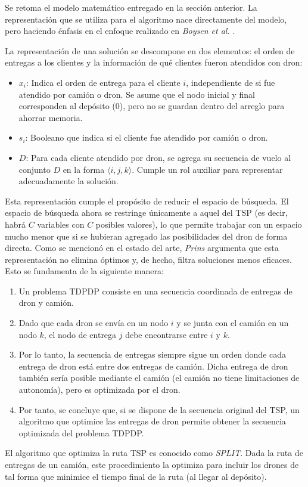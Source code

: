 Se retoma el modelo matemático entregado en la sección anterior. La representación que se utiliza para el algoritmo nace directamente del modelo, pero haciendo énfasis en el enfoque realizado en \textit{Boysen et al.} \cite{boysen2018drone}. 

La representación de una solución se descompone en dos elementos: el orden de entregas a los clientes y la información de qué clientes fueron atendidos con dron:

\begin{itemize}
\item $x_i$: Indica el orden de entrega para el cliente $i$, independiente de si fue atendido por camión o dron. Se asume que el nodo inicial y final corresponden al depósito ($0$), pero no se guardan dentro del arreglo para ahorrar memoria.
\item $s_i$: Booleano que indica si el cliente fue atendido por camión o dron.
\item $D$: Para cada cliente atendido por dron, se agrega su secuencia de vuelo al conjunto $D$ en la forma $\langle i, j, k \rangle$. Cumple un rol auxiliar para representar adecuadamente la solución.
\end{itemize}

Esta representación cumple el propósito de reducir el espacio de búsqueda. El espacio de búsqueda ahora se restringe únicamente a aquel del TSP (es decir, habrá $C$ variables con $C$ posibles valores), lo que permite trabajar con un espacio mucho menor que si se hubieran agregado las posibilidades del dron de forma directa. 
Como se mencionó en el estado del arte, \textit{Prins} \cite{prins2004simple} argumenta que esta representación no elimina óptimos y, de hecho, filtra soluciones menos eficaces. Esto se fundamenta de la siguiente manera:

\begin{enumerate}
\item Un problema TDPDP consiste en una secuencia coordinada de entregas de dron y camión. 
\item Dado que cada dron se envía en un nodo $i$ y se junta con el camión en un nodo $k$, el nodo de entrega $j$ debe encontrarse entre $i$ y $k$.
\item Por lo tanto, la secuencia de entregas siempre sigue un orden donde cada entrega de dron está entre dos entregas de camión. Dicha entrega de dron también sería posible mediante el camión (el camión no tiene limitaciones de autonomía), pero es optimizada por el dron.
\item Por tanto, se concluye que, si se dispone de la secuencia original del TSP, un algoritmo que optimice las entregas de dron permite obtener la secuencia optimizada del problema TDPDP.
\end{enumerate}

El algoritmo que optimiza la ruta TSP es conocido como \textit{SPLIT}. Dada la ruta de entregas de un camión, este procedimiento la optimiza para incluir los drones de tal forma que minimice el tiempo final de la ruta (al llegar al depósito).


